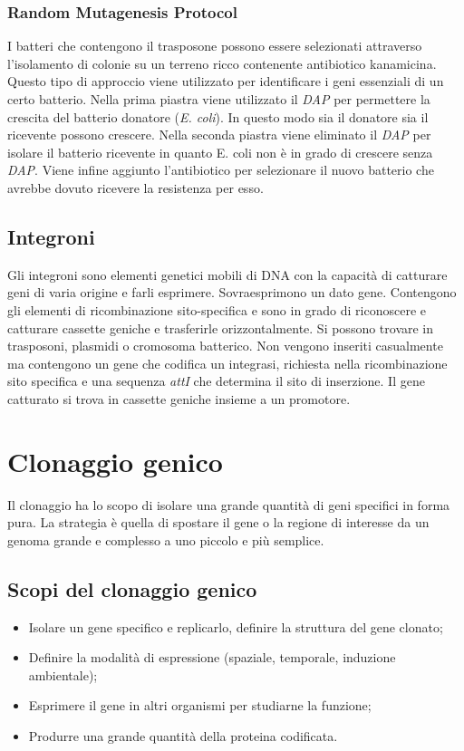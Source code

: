 		\subsubsection{Random Mutagenesis Protocol}
		I batteri che contengono il trasposone possono essere selezionati attraverso l'isolamento di colonie su un terreno ricco contenente antibiotico kanamicina. 
		Questo tipo di approccio viene utilizzato per identificare i geni essenziali di un certo batterio. 
		Nella prima piastra viene utilizzato il \emph{DAP} per permettere la crescita del batterio donatore (\textit{E. coli}). 
		In questo modo sia il donatore sia il ricevente possono crescere. 
		Nella seconda piastra viene eliminato il \emph{DAP} per isolare il batterio ricevente in quanto E. coli non \`e in grado di crescere senza \emph{DAP}.
		Viene infine aggiunto l'antibiotico per selezionare il nuovo batterio che avrebbe dovuto ricevere la resistenza per esso.

	\subsection{Integroni}
	Gli integroni sono elementi genetici mobili di DNA con la capacit\`a di catturare geni di varia origine e farli esprimere.
	Sovraesprimono un dato gene.
	Contengono gli elementi di ricombinazione sito-specifica e sono in grado di riconoscere e catturare cassette geniche e trasferirle orizzontalmente.
	Si possono trovare in trasposoni, plasmidi o cromosoma batterico.
	Non vengono inseriti casualmente ma contengono un gene che codifica un integrasi, richiesta nella ricombinazione sito specifica e una sequenza \emph{attI} che determina il sito di inserzione.
	Il gene catturato si trova in cassette geniche insieme a un promotore.
 
\section{Clonaggio genico}
Il clonaggio ha lo scopo di isolare una grande quantità di geni specifici in forma pura. 
La strategia è quella di spostare il gene o la regione di interesse da un genoma grande e complesso a uno piccolo e più semplice. 

	\subsection{Scopi del clonaggio genico}
	\begin{multicols}{2}
		\begin{itemize}
   			\item Isolare un gene specifico e replicarlo, definire la struttura del gene clonato;
    			\item Definire la modalità di espressione (spaziale, temporale, induzione ambientale); 
    			\item Esprimere il gene in altri organismi per studiarne la funzione;
    			\item Produrre una grande quantità della proteina codificata.
		\end{itemize}
	\end{multicols}

